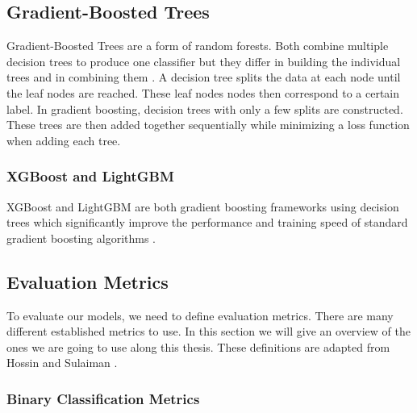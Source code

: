 \subsection{Gradient-Boosted Trees}
Gradient-Boosted Trees are a form of random forests. Both combine multiple decision trees to produce one classifier but they differ in building the individual trees and in combining them \cite{gradboost}. A decision tree splits the data at each node until the leaf nodes are reached. These leaf nodes nodes then correspond to a certain label. In gradient boosting, decision trees with only a few splits are constructed. These trees are then added together sequentially while minimizing a loss function when adding each tree.

\subsubsection{XGBoost and LightGBM}
XGBoost and LightGBM are both gradient boosting frameworks using decision trees which significantly improve the performance and training speed of standard gradient boosting algorithms \cite{xgboost, lgbm}.

\subsection{Evaluation Metrics}
To evaluate our models, we need to define evaluation metrics. There are many different established metrics to use. In this section we will give an overview of the ones we are going to use along this thesis. These definitions are adapted from Hossin and Sulaiman \cite{metrics}.

\subsubsection{Binary Classification Metrics}

